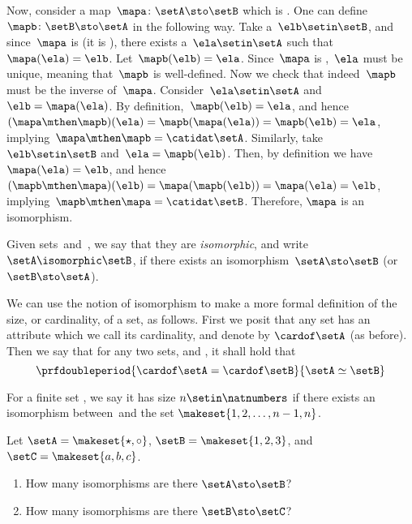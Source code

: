 \begin{solution}
    Now, consider a map~$\mapa\colon \setA \sto \setB$ which is .
    One can define~$\mapb\colon \setB \sto \setA$ in the following way.
    Take a~$\elb\setin\setB$, and since~$\mapa$ is  (it is ), there exists a~$\ela\setin\setA$ such that~$\mapa(\ela)=\elb$.
    Let~$\mapb(\elb)=\ela$.
    Since~$\mapa$ is ,~$\ela$ must be unique, meaning that~$\mapb$ is well-defined.
    Now we check that indeed~$\mapb$ must be the inverse of~$\mapa$.
    Consider~$\ela \setin\setA$ and~$\elb=\mapa(\ela)$.
    By definition,~$\mapb(\elb)=\ela$, and hence~$(\mapa\mthen \mapb)(\ela)=\mapb(\mapa(\ela))=\mapb(\elb)=\ela$, implying~$\mapa\mthen \mapb=\catidat\setA$.
    Similarly, take~$\elb\setin\setB$ and~$\ela=\mapb(\elb)$.
    Then, by definition we have~$\mapa(\ela)=\elb$, and hence~$(\mapb\mthen \mapa)(\elb)=\mapa(\mapb(\elb))=\mapa(\ela)=\elb$, implying~$\mapb\mthen \mapa=\catidat\setB$.
    Therefore, $\mapa$ is an isomorphism.
\end{solution}

\begin{ctdefinition}\label{def:set-isomorphic}
    Given sets~\setA and~\setB, we say that they are \emph{isomorphic}, and write~$\setA \isomorphic \setB$,
    if there exists an isomorphism~$\setA \sto \setB$ (or~$\setB \sto \setA$).
\end{ctdefinition}

We can use the notion of isomorphism to make a more formal definition of the size, or cardinality, of a set, as follows.
First we posit that any set \setA has an attribute which we call its cardinality, and denote by $\cardof \setA$ (as before).
Then we say that for any two sets, \setA and \setB, it shall hold that
\begin{equation}
    \prfdoubleperiod{
        \cardof \setA = \cardof \setB
    }{
        \setA \simeq \setB
    }
\end{equation}

For a finite set \setA, we say it has size $n \setin \natnumbers$ if there exists an isomorphism between~\setA and the set $\makeset{1,2, \dots, n-1, n}$.

\begin{gradedexercise}
    \label{ex:CountingIsos}

    Let $\setA = \makeset{{{\star}}, {{\circ}} }$, $\setB = \makeset{1, 2, 3}$, and $\setC = \makeset{a, b, c}$.
    \begin{enumerate}
        \item How many isomorphisms are there $\setA \sto \setB$?
        \item How many isomorphisms are there $\setB \sto \setC$?
    \end{enumerate}
\end{gradedexercise}

